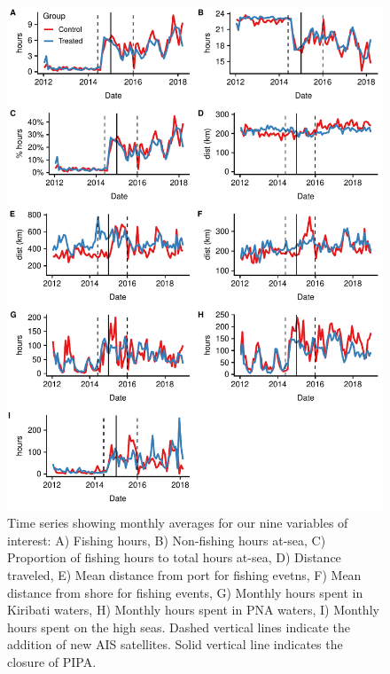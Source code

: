 \documentclass[9p,twocolumn,twoside,lineno]{pnas-new}
\begin{document}
\begin{figure}
\centering
\includegraphics{img/all_panels.pdf}
\caption{\label{fig:all_panels}Time series showing monthly averages for our nine variables of interest: A) Fishing hours, B) Non-fishing hours at-sea, C) Proportion of fishing hours to total hours at-sea, D) Distance traveled, E) Mean distance from port for fishing evetns, F) Mean distance from shore for fishing events, G) Monthly hours spent in Kiribati waters, H) Monthly hours spent in PNA waters, I) Monthly hours spent on the high seas. Dashed vertical lines indicate the addition of new AIS satellites. Solid vertical line indicates the closure of PIPA.}
\end{figure}

\clearpage
\end{document}
